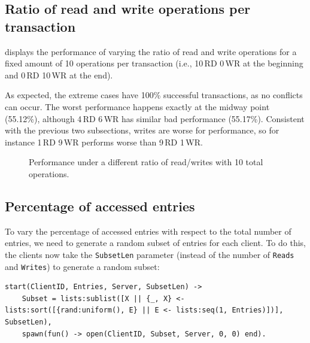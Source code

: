 \documentclass[a4paper, 10pt]{article}
\begin{document}
\subsection{Ratio of read and write operations per transaction}

 displays the performance of varying the ratio of read and write operations
for a fixed amount of 10 operations per transaction (i.e., 10\,RD 0\,WR at the beginning and 0\,RD 10\,WR at the end).

As expected, the extreme cases have 100\% successful transactions, as no conflicts can occur.
The worst performance happens exactly at the midway point (55.12\%), although 4\,RD 6\,WR has similar bad performance (55.17\%).
Consistent with the previous two subsections, writes are worse for performance, so for instance 1\,RD 9\,WR performs worse than 9\,RD 1\,WR.

\begin{figure}[htp]
\begin{center}
\caption{Performance under a different ratio of read/writes with 10 total operations.}
\label{fig:ratio}
\end{center}
\end{figure}


\subsection{Percentage of accessed entries} \label{sec:ptge}

To vary the percentage of accessed entries with
respect to the total number of entries,
we need to generate a random subset of entries for each client.
To do this, the clients now take the \texttt{SubsetLen} parameter (instead of the number of \texttt{Reads} and \texttt{Writes}) to generate a random subset:
\begin{verbatim}
start(ClientID, Entries, Server, SubsetLen) ->
    Subset = lists:sublist([X || {_, X} <- lists:sort([{rand:uniform(), E} || E <- lists:seq(1, Entries)])], SubsetLen),
    spawn(fun() -> open(ClientID, Subset, Server, 0, 0) end).
\end{verbatim}
\end{document}
